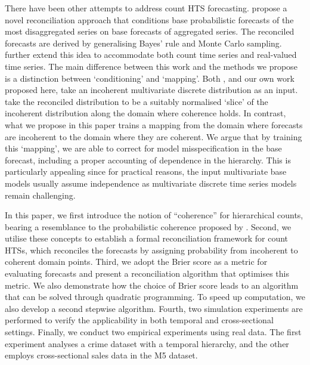 \documentclass[a4paper,review,12pt,authoryear]{elsarticle}
\theoremstyle{definition}
\begin{document}
There have been other attempts to address count HTS forecasting.
\cite{coraniProbabilisticReconciliationCount2022} propose a novel reconciliation approach that conditions base probabilistic forecasts of the most disaggregated series on base forecasts of aggregated series.
The reconciled forecasts are derived by generalising Bayes’ rule and Monte Carlo sampling.
\cite{zambonEfficientProbabilisticReconciliation2022} further extend this idea to accommodate both count time series and real-valued time series. The main difference between this work and the methods we propose is a distinction between `conditioning' and `mapping'. Both \cite{zambonEfficientProbabilisticReconciliation2022}, and our own work proposed here, take an incoherent multivariate discrete distribution as an input.  \cite{zambonEfficientProbabilisticReconciliation2022} take the reconciled distribution to be a suitably normalised `slice' of the incoherent distribution along the domain where coherence holds. In contrast, what we propose in this paper trains a mapping from the domain where forecasts are incoherent to the domain where they are coherent. We argue that by training this `mapping', we are able to correct for model misspecification in the base forecast, including a proper accounting of dependence in the hierarchy. This is particularly appealing since for practical reasons, the input multivariate base models usually assume independence as multivariate discrete time series models remain challenging.

In this paper,  we first introduce the notion of ``coherence'' for hierarchical counts,
bearing a resemblance to the probabilistic coherence proposed by \cite{panagiotelisProbabilisticForecastReconciliation2022}.
Second, we utilise these concepts to establish a formal reconciliation framework for count HTSs, which reconciles the forecasts by assigning probability from incoherent to coherent domain points.
Third, we adopt the Brier score as a metric for evaluating forecasts and present a reconciliation algorithm that optimises this metric.
We also demonstrate how the choice of Brier score leads to an algorithm that can be solved through quadratic programming. To speed up computation, we also develop a second stepwise algorithm.
Fourth, two simulation experiments are performed to verify the applicability in both temporal and cross-sectional settings.
Finally, we conduct two empirical experiments using real data. The first experiment analyses a crime dataset with a temporal hierarchy, and the other employs cross-sectional sales data in the M5 dataset.
\end{document}
